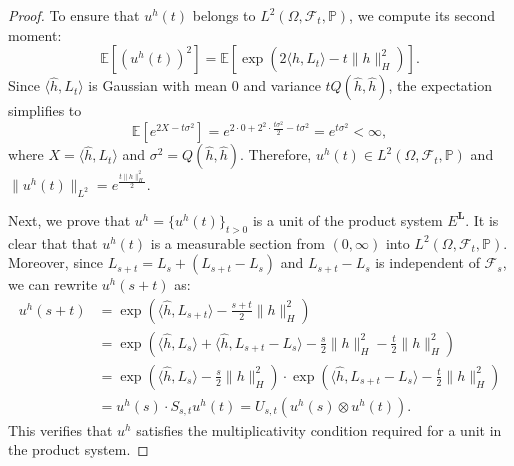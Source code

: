 \documentclass[11pt]{amsart}
\theoremstyle{definition}
\theoremstyle{remark}
\numberwithin{equation}{section}
\begin{document}
\begin{proof}
To ensure that \( u^h(t) \) belongs to \( L^2(\Omega, \mathcal{F}_t, \mathbb{P}) \), we compute its second moment:
\[
\mathbb{E}\left[ \left( u^h(t) \right)^2 \right] = \mathbb{E}\left[ \exp\left( 2 \langle \hat{h}, L_t \rangle - t \| h \|_H^2 \right) \right].
\]
Since \( \langle \hat{h}, L_t \rangle \) is Gaussian with mean \( 0 \) and variance \( t Q(\hat{h}, \hat{h}) \), the expectation simplifies to
\[
\mathbb{E}\left[ e^{2X - t \sigma^2} \right] = e^{2 \cdot 0 + 2^2 \cdot \frac{t \sigma^2}{2} - t \sigma^2} = e^{t \sigma^2} < \infty,
\]
where \( X = \langle \hat{h}, L_t \rangle \) and \( \sigma^2 = Q(\hat{h}, \hat{h}) \). Therefore, \( u^h(t) \in L^2(\Omega, \mathcal{F}_t, \mathbb{P}) \) and
\(
\| u^h(t) \|_{L^2} = e^{\frac{t\|h\|_H^2}{2}}.
\)

Next, we prove that \( u^h = \{ u^h(t) \}_{t > 0} \) is a unit of the product system \( E^{\bm{L}} \). It is clear that that \( u^h (t)\) is a measurable section from \( (0, \infty) \) into \( L^2(\Omega, \mathcal{F}_t, \mathbb{P}) \). Moreover, since \( L_{s+t} = L_s + (L_{s+t} - L_s) \) and \( L_{s+t} - L_s \) is independent of \( \mathcal{F}_s \), we can rewrite \( u^h(s+t) \) as:
\[
\begin{aligned}
u^{h}(s+t) &= \exp\left( \langle \hat{h}, L_{s+t} \rangle - \frac{s+t}{2} \| h \|_H^2 \right) \\
&= \exp\left( \langle \hat{h}, L_s \rangle + \langle \hat{h}, L_{s+t} - L_s \rangle - \frac{s}{2} \| h \|_H^2 - \frac{t}{2} \| h \|_H^2 \right) \\
&= \exp\left( \langle \hat{h}, L_s \rangle - \frac{s}{2} \| h \|_H^2 \right) \cdot \exp\left( \langle \hat{h}, L_{s+t} - L_s \rangle - \frac{t}{2} \| h \|_H^2 \right) \\
&= u^h(s) \cdot S_{s,t} u^h(t) = U_{s,t} \left( u^h(s) \otimes u^h(t) \right).
\end{aligned}
\]
This verifies that \( u^h \) satisfies the multiplicativity condition required for a unit in the product system.


\end{proof}
\end{document}
